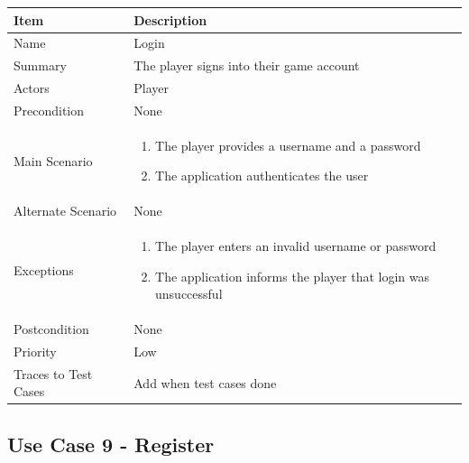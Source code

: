 \documentclass[12pt]{article}
\begin{document}
\begin{center}
\setlength{\tabcolsep}{18pt}
\renewcommand{\arraystretch}{1.3}
\begin{tabular}{ |p{3.4cm}|p{10cm}| }
    \hline
    
   \textbf{Item} & \textbf{Description} \\
    \hline
    Name & Login \\
    \hline
    Summary & The player signs into their game account \\
    \hline
    Actors & Player \\
    \hline
    Precondition & None \\
    \hline
    Main Scenario &     
    \vspace*{-0.1in}
    \begin{enumerate}[leftmargin=0.2in]
        \item The player provides a username and a password
        \item The application authenticates the user
    
       
    \end{enumerate}  \\
    \hline
    Alternate Scenario & None \\
    \hline
    Exceptions & 
    \vspace*{-0.1in}
    \begin{enumerate}[leftmargin=0.2in]
        \item The player enters an invalid username or password
        \item The application informs the player that login was unsuccessful
    \end{enumerate}  \\
    \hline
    Postcondition & None \\
    \hline
    Priority & Low  \\
    \hline
    \small{Traces to Test Cases} & Add when test cases done  \\
    \hline
\end{tabular}
\end{center}

\newpage


\subsection{Use Case 9 - Register}
\end{document}
